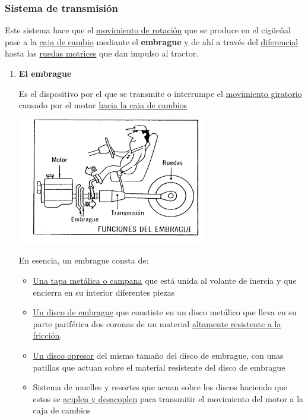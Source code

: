 \documentclass[a4paper,12pt,oneside]{article}
\begin{document}
\subsubsection{Sistema de transmisión}
\label{sec:org3111a3b}
Este sistema hace que el \uline{movimiento de rotación} que se produce en el cigüeñal
pase a la \uline{caja de cambio} mediante el \textbf{embrague} y de ahí a través del
\uline{diferencial} hasta las \uline{ruedas motrices} que dan impulso al tractor.
\begin{enumerate}
\item \textbf{El embrague}
\label{sec:orgb23285d}

Es el dispositivo por el que se transmite o interrumpe el \uline{movimiento
giratorio} causado por el motor \uline{hacia la caja de cambios}

\begin{center}
\begin{center}
\includegraphics[width=0.65\textwidth]{./img_0009/embrague_1.png}
\end{center}
\end{center}
En esencia, un embrague consta de:
\begin{itemize}
\item \uline{Una tapa metálica o campana} que está unida al volante de inercia y que
encierra en su interior diferentes piezas
\item \uline{Un disco de embrague} que constiste en un disco metálico que lleva en su
parte pariférica dos coronas de un material \uline{altamente resistente a la fricción}.
\item \uline{Un disco opresor} del mismo tamaño del disco de embrague, con unas patillas
que actuan sobre el material resistente del disco de embrague
\item Sistema de muelles y resortes que acuan sobre los discos haciendo que estos se
\uline{aciplen y desacoplen} para transmitir el movimiento del motor a la caja de
cambios
\end{itemize}


\end{enumerate}
\end{document}
